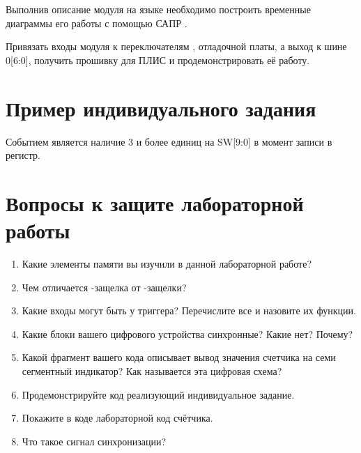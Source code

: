 \par{Выполнив описание модуля на языке  необходимо построить временные диаграммы его работы с помощью САПР .}		
		
\par{Привязать входы модуля к переключателям , отладочной платы, а выход к шине 0[6:0], получить прошивку для ПЛИС и продемонстрировать её работу.}
		
\section{Пример индивидуального задания}

\par{Событием является наличие 3 и более единиц на SW[9:0] в момент записи в регистр.}


		
\section{Вопросы к защите лабораторной работы}

\begin{enumerate}[noitemsep,topsep=0pt, after=\vspace{2pt}]
  \item Какие элементы памяти вы изучили в данной лабораторной работе?
  \item Чем отличается -защелка от -защелки?
  \item Какие входы могут быть у триггера? Перечислите все и назовите их функции.
  \item Какие блоки вашего цифрового устройства синхронные? Какие нет? Почему?
  \item Какой фрагмент вашего кода описывает вывод значения счетчика на семи сегментный индикатор? Как называется эта цифровая схема?
  \item Продемонстрируйте код реализующий индивидуальное задание.
  \item Покажите в коде лабораторной код счётчика.
  \item Что такое сигнал синхронизации?
\end{enumerate}
